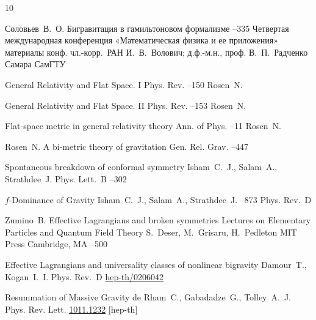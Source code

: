 \begin{thebibliography}{10}

\by Соловьев~В.~О.
\paper Бигравитация  в гамильтоновом формализме
--335
\inbook Четвертая международная конференция «Математическая физика и ее приложения»
\bookinfo материалы конф. 
\eds чл.-корр.~РАН И.~В.~Волович; д.ф.-м.н., проф. В.~П.~Радченко
\publaddr Самара
\publ СамГТУ


\paper General Relativity and Flat Space. I
\jour Phys. Rev.
--150
\by Rosen~N.

\paper General Relativity and Flat Space. II
\jour Phys. Rev.
--153
\by Rosen~N.

\paper Flat-space metric in general relativity theory
\jour Ann. of Phys.
--11 
\by Rosen~N.

\by Rosen~N.
\paper A bi-metric theory of gravitation
\jour Gen. Rel. Grav.
--447 


\paper Spontaneous breakdown of conformal symmetry
\by Isham~C.~J., Salam~A., Strathdee~J. 
\jour Phys. Lett.~B
--302 

\paper $f$-Dominance of Gravity
\by Isham~C.~J., Salam~A., Strathdee~J. 
--873
\jour Phys. Rev.~D

\by  Zumino~B.
\paper Effective Lagrangians and broken symmetries
\inbook Lectures on Elementary Particles and Quantum Field Theory
\eds S.~Deser, M.~Grisaru, H.~Pedleton
\publ MIT Press
\publaddr Cambridge, MA
--500

\paper Effective Lagrangians and universality classes of nonlinear bigravity
\by Damour~T., Kogan~I.~I.
\jour Phys. Rev.~D 
\arxiv \href{http://arxiv.org/abs/hep-th/0206042}{hep-th/0206042}

\paper Resummation of Massive Gravity
\by  de Rham~C.,  Gabadadze~G., Tolley~A.~J.
\jour Phys. Rev. Lett.
\arxiv \href{http://arxiv.org/abs/1011.1232}{1011.1232} [hep-th]



\end{thebibliography}
